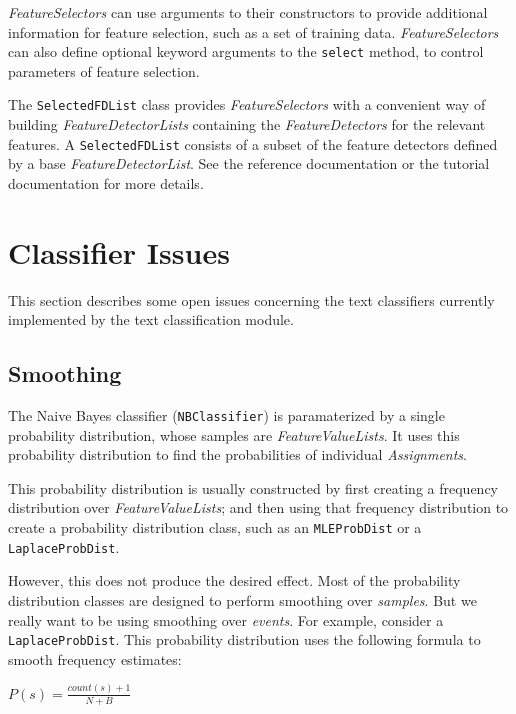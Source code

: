 \documentclass[12pt]{article}
\begin{document}
    \textit{FeatureSelectors} can use arguments to their constructors
    to provide additional information for feature selection, such as a
    set of training data.  \textit{FeatureSelectors} can also define
    optional keyword arguments to the \texttt{select} method, to
    control parameters of feature selection.

    The \texttt{SelectedFDList} class provides
    \textit{FeatureSelectors} with a convenient way of building
    \textit{FeatureDetectorLists} containing the
    \textit{FeatureDetectors} for the relevant features.  A
    \texttt{SelectedFDList} consists of a subset of the feature
    detectors defined by a base \textit{FeatureDetectorList}.  See the
    reference documentation or the tutorial documentation for more
    details.

\section{Classifier Issues}

  This section describes some open issues concerning the text
  classifiers currently implemented by the text classification module.

  \subsection{Smoothing}

    The Naive Bayes classifier (\texttt{NBClassifier}) is
    paramaterized by a single probability distribution, whose samples
    are \textit{FeatureValueLists}.  It uses this probability
    distribution to find the probabilities of individual
    \textit{Assignments}.

    This probability distribution is usually constructed by first
    creating a frequency distribution over \textit{FeatureValueLists};
    and then using that frequency distribution to create a probability
    distribution class, such as an \texttt{MLEProbDist} or a
    \texttt{LaplaceProbDist}.

    However, this does not produce the desired effect.  Most of the
    probability distribution classes are designed to perform smoothing
    over \emph{samples}.  But we really want to be using smoothing
    over \emph{events}.  For example, consider a
    \texttt{LaplaceProbDist}.  This probability distribution uses the
    following formula to smooth frequency estimates:

      $P(s) = \frac{count(s) + 1}{N+B}$
\end{document}

